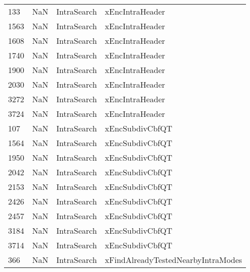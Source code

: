 \begin{tabular}{llll}
133  &                   NaN &                IntraSearch &                           xEncIntraHeader \\
1563 &                   NaN &                IntraSearch &                           xEncIntraHeader \\
1608 &                   NaN &                IntraSearch &                           xEncIntraHeader \\
1740 &                   NaN &                IntraSearch &                           xEncIntraHeader \\
1900 &                   NaN &                IntraSearch &                           xEncIntraHeader \\
2030 &                   NaN &                IntraSearch &                           xEncIntraHeader \\
3272 &                   NaN &                IntraSearch &                           xEncIntraHeader \\
3724 &                   NaN &                IntraSearch &                           xEncIntraHeader \\
107  &                   NaN &                IntraSearch &                           xEncSubdivCbfQT \\
1564 &                   NaN &                IntraSearch &                           xEncSubdivCbfQT \\
1950 &                   NaN &                IntraSearch &                           xEncSubdivCbfQT \\
2042 &                   NaN &                IntraSearch &                           xEncSubdivCbfQT \\
2153 &                   NaN &                IntraSearch &                           xEncSubdivCbfQT \\
2426 &                   NaN &                IntraSearch &                           xEncSubdivCbfQT \\
2457 &                   NaN &                IntraSearch &                           xEncSubdivCbfQT \\
3184 &                   NaN &                IntraSearch &                           xEncSubdivCbfQT \\
3714 &                   NaN &                IntraSearch &                           xEncSubdivCbfQT \\
366  &                   NaN &                IntraSearch &        xFindAlreadyTestedNearbyIntraModes \\

\end{tabular}
